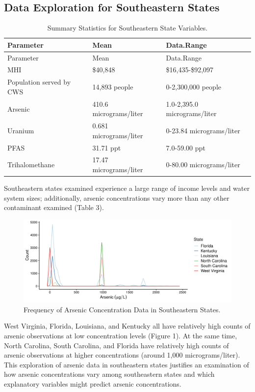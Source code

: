 \documentclass[12pt,]{article}
\begin{document}
\hypertarget{data-exploration-for-southeastern-states}{%
\subsection{Data Exploration for Southeastern
States}\label{data-exploration-for-southeastern-states}}

\begin{longtable}[]{@{}lll@{}}
\caption{Summary Statistics for Southeastern State
Variables.}\tabularnewline
\toprule
Parameter & Mean & Data.Range\tabularnewline
\midrule
\endfirsthead
\toprule
Parameter & Mean & Data.Range\tabularnewline
\midrule
\endhead
MHI & \$40,848 & \$16,435-\$92,097\tabularnewline
Population served by CWS & 14,893 people & 0-2,300,000
people\tabularnewline
Arsenic & 410.6 micrograms/liter & 1.0-2,395.0
micrograms/liter\tabularnewline
Uranium & 0.681 micrograms/liter & 0-23.84
micrograms/liter\tabularnewline
PFAS & 31.71 ppt & 7.0-59.00 ppt\tabularnewline
Trihalomethane & 17.47 micrograms/liter & 0-80.00
micrograms/liter\tabularnewline
\bottomrule
\end{longtable}

\begin{quote}
\end{quote}

Southeastern states examined experience a large range of income levels
and water system sizes; additionally, arsenic concentrations vary more
than any other contaminant examined (Table 3).

\begin{figure}
\centering
\includegraphics{Project_Template_files/figure-latex/figs-1.pdf}
\caption{Frequency of Arsenic Concentration Data in Southeastern
States.}
\end{figure}

West Virginia, Florida, Louisiana, and Kentucky all have relatively high
counts of arsenic observations at low concentration levels (Figure 1).
At the same time, North Carolina, South Carolina, and Florida have
relatively high counts of arsenic observations at higher concentrations
(around 1,000 micrograms/liter). This exploration of arsenic data in
southeastern states justifies an examination of how arsenic
concentrations vary among southeastern states and which explanatory
variables might predict arsenic concentrations.
\end{document}
